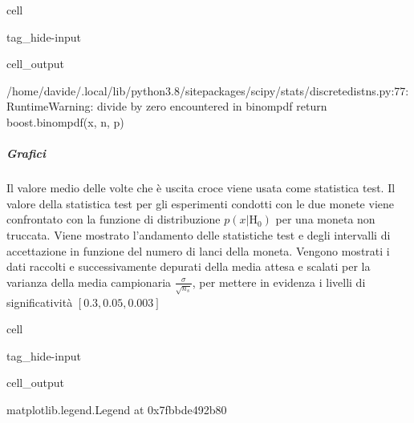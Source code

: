 \documentclass[letterpaper,10pt,italian]{jupyterBook}
\begin{document}
\begin{sphinxuseclass}{cell}
\begin{sphinxuseclass}{tag_hide-input}\begin{sphinxVerbatimOutput}

\begin{sphinxuseclass}{cell_output}
\begin{sphinxVerbatim}[commandchars=\\\{\}]
/home/davide/.local/lib/python3.8/site\PYGZhy{}packages/scipy/stats/\PYGZus{}discrete\PYGZus{}distns.py:77: RuntimeWarning: divide by zero encountered in \PYGZus{}binom\PYGZus{}pdf
  return \PYGZus{}boost.\PYGZus{}binom\PYGZus{}pdf(x, n, p)
\end{sphinxVerbatim}

\end{sphinxuseclass}\end{sphinxVerbatimOutput}

\end{sphinxuseclass}
\end{sphinxuseclass}

\subparagraph{Grafici}
\label{\detokenize{ch/statistics/test-fisher-coin-2:grafici}}
\sphinxAtStartPar
Il valore medio delle volte che è uscita croce viene usata come statistica test. Il valore della statistica test per gli esperimenti condotti con le due monete viene confrontato con la funzione di distribuzione \(p(x|\text{H}_0)\) per una moneta non truccata. Viene mostrato l’andamento delle statistiche test e degli intervalli di accettazione in funzione del numero di lanci della moneta. Vengono mostrati i dati raccolti e successivamente depurati della media attesa e scalati per la varianza della media campionaria \(\frac{\sigma}{\sqrt{n_s}}\), per mettere in evidenza i livelli di significatività \([0.3, 0.05, 0.003]\)

\begin{sphinxuseclass}{cell}
\begin{sphinxuseclass}{tag_hide-input}\begin{sphinxVerbatimOutput}

\begin{sphinxuseclass}{cell_output}
\begin{sphinxVerbatim}[commandchars=\\\{\}]
\PYGZlt{}matplotlib.legend.Legend at 0x7fbbde492b80\PYGZgt{}
\end{sphinxVerbatim}

\noindent{}

\end{sphinxuseclass}\end{sphinxVerbatimOutput}

\end{sphinxuseclass}
\end{sphinxuseclass}
\sphinxstepscope
\end{document}
